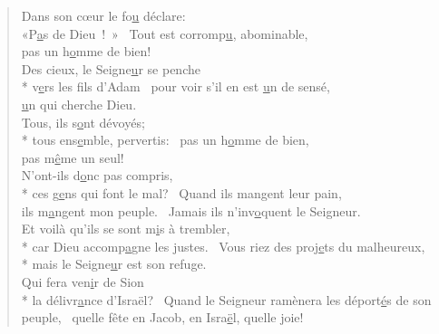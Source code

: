 
\begin{verse}
Dans son cœur le fo\underline{u} déclare: \\
«P\underline{a}s de Dieu ! »~\psalmstar
Tout est corromp\underline{u}, abominable, \\
pas un h\underline{o}mme de bien! \\

Des cieux, le Seigne\underline{u}r se penche \\*
v\underline{e}rs les fils d’Adam~\psalmstar
pour voir s’il en est \underline{u}n de sensé, \\
\underline{u}n qui cherche Dieu. \\

Tous, ils s\underline{o}nt dévoyés; \\*
tous ens\underline{e}mble, pervertis:~\psalmstar
pas un h\underline{o}mme de bien, \\
pas m\underline{ê}me un seul! \\

N’ont-ils d\underline{o}nc pas compris, \\*
ces g\underline{e}ns qui font le mal?~\psalmdagger
Quand ils mangent leur pain, \\
ils m\underline{a}ngent mon peuple.~\psalmstar
Jamais ils n’inv\underline{o}quent le Seigneur. \\

Et voilà qu’ils se sont m\underline{i}s à trembler, \\*
car Dieu accomp\underline{a}gne les justes.~\psalmstar
{}Vous riez des proj\underline{e}ts du malheureux, \\*
mais le Seigne\underline{u}r est son refuge. \\

Qui fera ven\underline{i}r de Sion \\*
la délivr\underline{a}nce d’Israël?~\psalmdagger
Quand le Seigneur ramènera les déport\underline{é}s de son peuple,~\psalmstar
quelle fête en Jacob, en Isra\underline{ë}l, quelle joie! \\
\end{verse}


